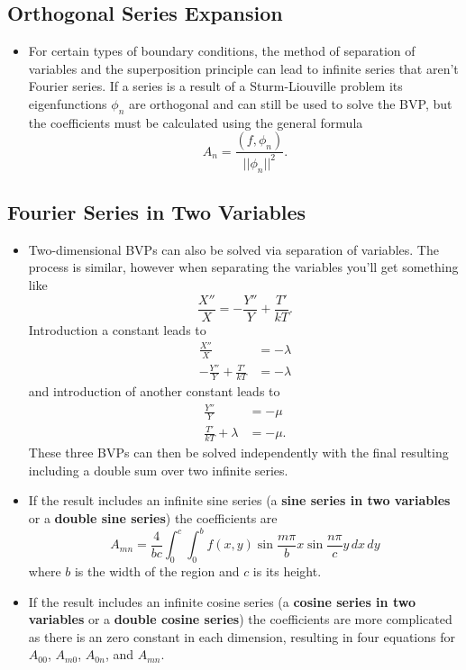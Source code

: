\documentclass{article}
\begin{document}
\subsection{Orthogonal Series Expansion}

\begin{itemize}
  \item For certain types of boundary conditions, the method of separation of variables and the superposition principle can lead to infinite series that aren't Fourier series. If a series is a result of a Sturm-Liouville problem its eigenfunctions $\phi_n$ are orthogonal and can still be used to solve the BVP, but the coefficients must be calculated using the general formula \[A_n = \frac{(f, \phi_n)}{||\phi_n||^2}.\]
\end{itemize}

\subsection{Fourier Series in Two Variables}

\begin{itemize}
  \item Two-dimensional BVPs can also be solved via separation of variables. The process is similar, however when separating the variables you'll get something like \[\frac{X''}{X} = -\frac{Y''}{Y} + \frac{T'}{k T}.\] Introduction a constant leads to \begin{align*}
          \frac{X''}{X}                   & = -\lambda \\
          -\frac{Y''}{Y} + \frac{T'}{k T} & = -\lambda
        \end{align*} and introduction of another constant leads to \begin{align*}
          \frac{Y''}{Y}            & = -\mu  \\
          \frac{T'}{k T} + \lambda & = -\mu.
        \end{align*} These three BVPs can then be solved independently with the final resulting including a double sum over two infinite series.

  \item If the result includes an infinite sine series (a \textbf{sine series in two variables} or a \textbf{double sine series}) the coefficients are \[A_{m n} = \frac{4}{b c} \int_0^c \int_0^b f(x, y) \sin \frac{m \pi}{b} x \sin \frac{n \pi}{c} y \,d x \,d y\] where $b$ is the width of the region and $c$ is its height.

  \item If the result includes an infinite cosine series (a \textbf{cosine series in two variables} or a \textbf{double cosine series}) the coefficients are more complicated as there is an zero constant in each dimension, resulting in four equations for $A_{0 0}$, $A_{m 0}$, $A_{0 n}$, and $A_{m n}$.
\end{itemize}
\end{document}
